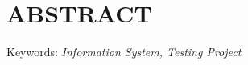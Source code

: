 %

\chapter*{ABSTRACT}

\begin{singlespace}
\lipsum[1-2] %
Keywords: \textit{Information System, Testing Project}
\end{singlespace}

\newpage
